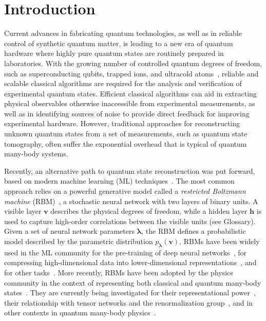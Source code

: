 \documentclass[submission, Phys, hidelnks]{SciPost}
\begin{document}
\section{Introduction}
Current advances in fabricating quantum technologies, as well as in reliable
control of synthetic quantum matter, is leading to a new era of quantum
hardware where highly pure quantum states are routinely prepared in laboratories.
With the growing number of controlled quantum degrees of freedom, such as
superconducting qubits, trapped ions, and ultracold
atoms~\cite{kandala_hardware-efficient_2017,moll_quantum_2018,bernien_probing_2017,zhang_observation_2017}, reliable and scalable
classical algorithms are required for the analysis and verification of
experimental quantum states. Efficient classical algorithms can aid in
extracting physical observables otherwise inaccessible from experimental
measurements, as well as in identifying sources of noise to provide direct
feedback for improving experimental hardware. However, traditional approaches
for reconstructing unknown quantum states from a set of measurements, such as
quantum state tomography, often suffer the exponential overhead that is typical
of quantum many-body systems.

Recently, an alternative path to quantum state reconstruction was put forward,
based on modern machine learning (ML)
techniques~\cite{torlai_neural-network_2018,torlai_latent_2018,carrasquilla_reconstructing_2018,lennon_efficiently_2018,kim_mixed_2018}.
The most common approach relies on a powerful generative model called a
\textit{restricted Boltzmann machine} (RBM)~\cite{smolensky_information_1986},
a stochastic neural network with two layers of binary units.
A visible layer $\bm{v}$ describes the physical degrees of freedom, while a
hidden layer $\bm{h}$ is used to capture high-order correlations between the
visible units (see Glossary). Given a set of neural network parameters
 $\bm{\lambda}$, the RBM defines a probabilistic model described by the
 parametric distribution $p_{\bm{\lambda}}(\bm{v})$.
RBMs have been widely used in the ML community for the pre-training of deep
neural networks~\cite{hinton_training_2002}, for compressing high-dimensional
data into lower-dimensional representations~\cite{hinton_reducing_2006}, and
for other tasks~\cite{lecun_deep_2015}.
More recently, RBMs have been adopted by the physics community in the context
of representing both classical and quantum many-body
states~\cite{torlai_learning_2016,CarleoTroyer2017Science,carleo_constructing_2018}.
They are currently being investigated for their representational
power~\cite{gao_efficient_2017,choo_symmetries_2018,glasser_neural-network_2018},
their relationship with tensor networks and the renormalization
group~\cite{mehta_exact_2014,koch-janusz_mutual_2018,iso_scale-invariant_2018,lenggenhager_optimal_2018,chen_equivalence_2018},
and in other contexts in quantum many-body physics~\cite{PhysRevB.96.205152,weinstein_neural_2018}.
\end{document}

